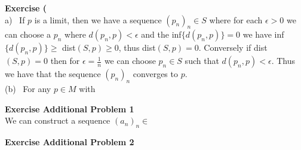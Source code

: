 \documentclass[12pt]{article}
\newenvironment{ques}[1]{\textbf{Exercise #1}\vspace{1 mm}\\ }{\bigskip}
\theoremstyle{definition}
\begin{document}
\begin{ques}{55}
	(a) \ If $p$ is a limit, then we have a sequence $(p_n)_n \in S$ where for each
	$\epsilon > 0$ we can choose a $p_n$ where $d(p_n,p) < \epsilon$ and 
	the inf$\{d(p_n,p)\} = 0$ we have inf$\{d(p_n,p)\} \geq$ dist$(S,p) \geq
	0$, thus dist$(S,p) = 0$. Conversely if dist$(S,p) = 0$ then for $\epsilon =
	\frac 1 n$ we can choose $p_n \in S$ such that $d(p_n,p) < \epsilon$. Thus
	we have that the sequence $(p_n)_n$ converges to $p$.\\
	(b) \ For any $p \in M$ with 
\end{ques}

\begin{ques}{Additional Problem 1}
	We can construct a sequence $(a_n)_n \in $
\end{ques}

\begin{ques}{Additional Problem 2}
	
\end{ques}
\end{document}
